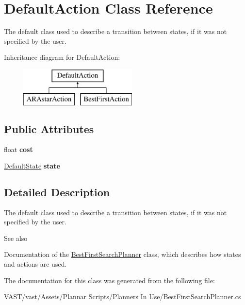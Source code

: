 \hypertarget{class_default_action}{\section{Default\-Action Class Reference}
\label{class_default_action}
}


The default class used to describe a transition between states, if it was not specified by the user.  


Inheritance diagram for Default\-Action\-:\begin{figure}[H]
\begin{center}
\leavevmode
\includegraphics[height=2.000000cm]{class_default_action}
\end{center}
\end{figure}
\subsection*{Public Attributes}
\begin{DoxyCompactItemize}
\item 
\hypertarget{class_default_action_a1ccad71698500fe44418f8242854e4dc}{float {\bfseries cost}}\label{class_default_action_a1ccad71698500fe44418f8242854e4dc}

\item 
\hypertarget{class_default_action_ac8d9ed08df293eb8657051e181a68782}{\hyperlink{class_default_state}{Default\-State} {\bfseries state}}\label{class_default_action_ac8d9ed08df293eb8657051e181a68782}

\end{DoxyCompactItemize}


\subsection{Detailed Description}
The default class used to describe a transition between states, if it was not specified by the user. 

\begin{DoxySeeAlso}{See also}

\begin{DoxyItemize}
\item Documentation of the \hyperlink{class_best_first_search_planner}{Best\-First\-Search\-Planner} class, which describes how states and actions are used. 
\end{DoxyItemize}
\end{DoxySeeAlso}


The documentation for this class was generated from the following file\-:\begin{DoxyCompactItemize}
\item 
V\-A\-S\-T/vast/\-Assets/\-Plannar Scripts/\-Planners In Use/Best\-First\-Search\-Planner.\-cs\end{DoxyCompactItemize}
